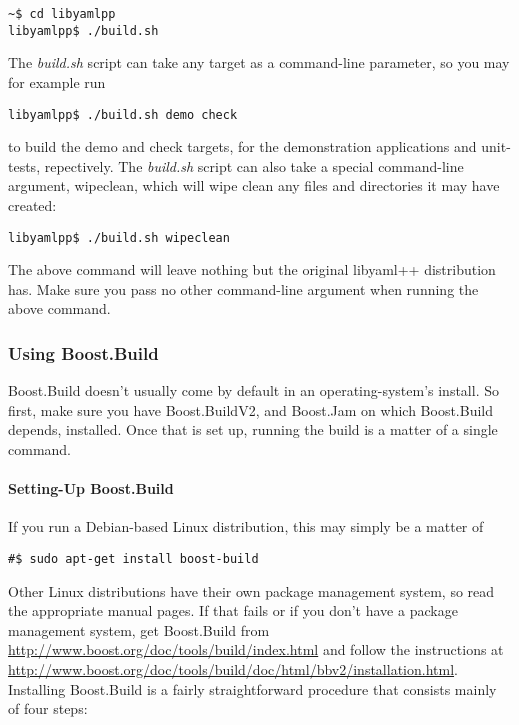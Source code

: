 \documentclass{article}
\begin{document}
\begin{verbatim}
~$ cd libyamlpp
libyamlpp$ ./build.sh
\end{verbatim}

The \textit{build.sh} script can take any target as a command-line parameter, so you may
for example run

\begin{verbatim}
libyamlpp$ ./build.sh demo check
\end{verbatim}

to build the demo and check targets, for the demonstration applications and
unit-tests, repectively.  The \textit{build.sh} script can also take a special
command-line argument, wipeclean, which will wipe clean any files and
directories it may have created:

\begin{verbatim}
libyamlpp$ ./build.sh wipeclean
\end{verbatim}

The above command will leave nothing but the original libyaml++ distribution
has.  Make sure you pass no other command-line argument when running the above
command.

\subsubsection{Using Boost.Build}

Boost.Build doesn't usually come by default in an operating-system's install.
So first, make sure you have Boost.BuildV2, and Boost.Jam on which Boost.Build
depends, installed.  Once that is set up, running the build is a matter of a
single command.


\paragraph{Setting-Up Boost.Build}


If you run a Debian-based Linux distribution, this may simply be a matter of

\begin{verbatim}
#$ sudo apt-get install boost-build
\end{verbatim}

Other Linux distributions have their own package management system, so read the
appropriate manual pages.  If that fails or if you don't have a package
management system, get Boost.Build from
\url{http://www.boost.org/doc/tools/build/index.html} and follow the instructions
at \url{http://www.boost.org/doc/tools/build/doc/html/bbv2/installation.html}.
Installing Boost.Build is a fairly straightforward procedure that consists
mainly of four steps:
\end{document}
